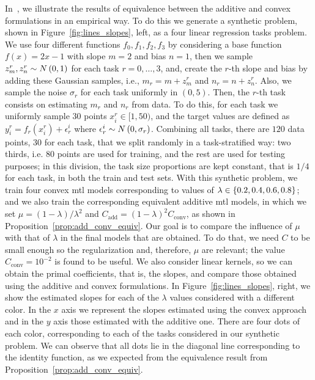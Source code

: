 In~\citep{RuizAD19}, we illustrate the results of equivalence between the additive and convex formulations in an empirical way. To do this we generate a synthetic problem, shown in Figure~\ref{fig:lines_slopes}, left, as a four linear regression tasks problem. 
%
We use four different functions $f_0, f_1, f_2, f_3$ by considering a base function $f(x) = 2x - 1$ with slope $m=2$ and bias $n=1$, then we sample $z_m^r, z_n^r \sim N \left(0, 1\right)$ for each task $r=0, \ldots, 3$, and, create the $r$-th slope and bias by adding these Gaussian samples, i.e., $m_r = m + z_m^r$ and $n_r = n + z_n^r$. Also, we sample the noise $\sigma_r$ for each task uniformly in $(0, 5)$. 
%
Then, the $r$-th task consists on estimating $m_r$ and $n_r$ from data. To do this, for each task we uniformly sample $30$ points $x_i^r \in [1, 50)$, and the target values are defined as $y_i^r = f_r(x_i^r) + \epsilon^i_r$ where $\epsilon^i_r \sim N \left(0, \sigma_r\right)$.
%
Combining all tasks, there are $120$ data points, $30$ for each task, that we split randomly in a task-stratified way: two thirds, i.e. $80$ points are used for training, and the rest are used for testing purposes; in this division, the task size proportions are kept constant, that is $1/4$ for each task, in both the train and test sets. 
%
With this synthetic problem, we train four convex \acrshort{mtl} models corresponding to values of $\lambda \in \left\{0.2, 0.4, 0.6, 0.8\right\}$; and we also train the corresponding equivalent additive \acrshort{mtl} models, in which we set $\mu = (1 - \lambda)/\lambda^2$ and $C_\text{add} = (1 - \lambda)^2 C_\text{conv}$, as shown in Proposition~\ref{prop:add_conv_equiv}.
%
Our goal is to compare the influence of $\mu$ with that of $\lambda$ in the final models that are obtained. To do that, we need $C$ to be small enough so the regularization and, therefore, $\mu$ are relevant; the value $C_{\text{conv}} = 10^{-2}$ is found to be useful. We also consider linear kernels, so we can obtain the primal coefficients, that is, the slopes, and compare those obtained using the additive and convex formulations. In Figure~\ref{fig:lines_slopes}, right, we show the estimated slopes for each of the $\lambda$ values considered with a different color. In the $x$ axis we represent the slopes estimated using the convex approach and in the $y$ axis those estimated with the additive one. There are four dots of each color, corresponding to each of the tasks considered in our synthetic problem. We can observe that all dots lie in the diagonal line corresponding to the identity function, as we expected from the equivalence result from Proposition~\ref{prop:add_conv_equiv}.

